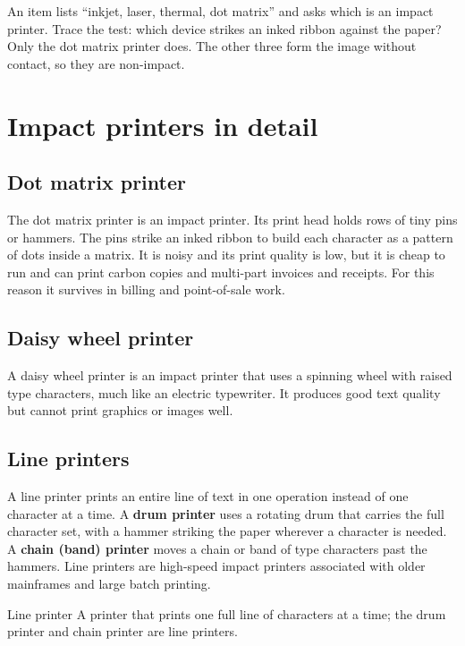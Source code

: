 \begin{example}
An item lists ``inkjet, laser, thermal, dot matrix'' and asks which is an
impact printer. Trace the test: which device strikes an inked ribbon against
the paper? Only the dot matrix printer does. The other three form the image
without contact, so they are non-impact.
\end{example}

\section{Impact printers in detail}
\subsection*{Dot matrix printer}
The dot matrix printer is an impact printer. Its print head holds rows of
tiny pins or hammers. The pins strike an inked ribbon to build each character
as a pattern of dots inside a matrix. It is noisy and its print quality is
low, but it is cheap to run and can print carbon copies and multi-part
invoices and receipts. For this reason it survives in billing and point-of-sale
work.

\subsection*{Daisy wheel printer}
A daisy wheel printer is an impact printer that uses a spinning wheel with
raised type characters, much like an electric typewriter. It produces good
text quality but cannot print graphics or images well.

\subsection*{Line printers}
A line printer prints an entire line of text in one operation instead of one
character at a time. A \textbf{drum printer} uses a rotating drum that carries
the full character set, with a hammer striking the paper wherever a character
is needed. A \textbf{chain (band) printer} moves a chain or band of type
characters past the hammers. Line printers are high-speed impact printers
associated with older mainframes and large batch printing.

\begin{definitionbox}{Line printer}
A printer that prints one full line of characters at a time; the drum printer
and chain printer are line printers.
\end{definitionbox}


